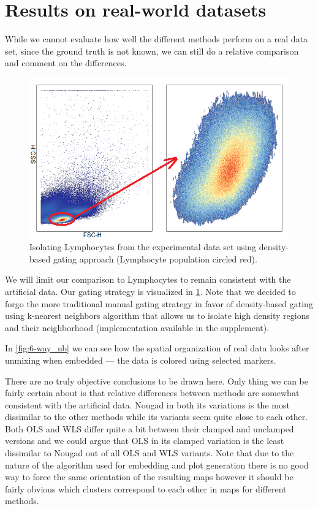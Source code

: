 \section{Results on real-world datasets}
While we cannot evaluate how well the different methods perform on a real data set, since the ground truth is not known, we can still do a relative comparison and comment on the differences.

\begin{figure}
  \includegraphics[width=1\linewidth]{img/my_gate.png}
  \caption{Isolating Lymphocytes from the experimental data set using density-based gating approach (Lymphocyte population circled red).}
  \label{fig:my_gate}
\end{figure}


We will limit our comparison to Lymphocytes to remain consistent with the artificial data. Our gating strategy is visualized in \cref{fig:my_gate}. Note that we decided to forgo the more traditional manual gating strategy in favor of density-based gating using k-nearest neighbors algorithm that allows us to isolate high density regions and their neighborhood (implementation available in the supplement).

In \cref{fig:6-way_nb} we can see how the spatial organization of real data looks after unmixing when embedded --- the data is colored using selected markers.

There are no truly objective conclusions to be drawn here. Only thing we can be fairly certain about is that relative differences between methods are somewhat consistent with the artificial data. Nougad in both its variations is the most dissimilar to the other methods while its variants seem quite close to each other. Both OLS and WLS differ quite a bit between their clamped and unclamped versions and we could argue that OLS in its clamped variation is the least dissimilar to Nougad out of all OLS and WLS variants. Note that due to the nature of the algorithm used for embedding and plot generation there is no good way to force the same orientation of the resulting maps however it should be fairly obvious which clusters correspond to each other in maps for different methods.

